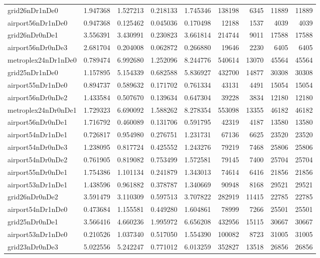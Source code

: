 \begin{longtable}{|l|r|r|r|r|r|r|r|r|}
grid26nDr1nDe0 & 1.947368 & 1.527213 & 0.218133 & 1.745346 & 138198 & 6345 & 11889 & 11889 \\
airport56nDr1nDe0 & 0.947368 & 0.125462 & 0.045036 & 0.170498 & 12188 & 1537 & 4039 & 4039 \\
grid26nDr0nDe1 & 3.556391 & 3.430991 & 0.230823 & 3.661814 & 214744 & 9011 & 17588 & 17588 \\
airport56nDr0nDe3 & 2.681704 & 0.204008 & 0.062872 & 0.266880 & 19646 & 2230 & 6405 & 6405 \\
metroplex24nDr1nDe0 & 0.789474 & 6.992680 & 1.252096 & 8.244776 & 540614 & 13070 & 45564 & 45564 \\
grid25nDr1nDe0 & 1.157895 & 5.154339 & 0.682588 & 5.836927 & 432700 & 14877 & 30308 & 30308 \\
airport55nDr1nDe0 & 0.894737 & 0.589632 & 0.171702 & 0.761334 & 43131 & 4491 & 15054 & 15054 \\
airport56nDr0nDe2 & 1.433584 & 0.507670 & 0.139634 & 0.647304 & 39228 & 3834 & 12180 & 12180 \\
metroplex24nDr0nDe1 & 1.729323 & 6.690092 & 1.588262 & 8.278354 & 553098 & 13355 & 46182 & 46182 \\
airport56nDr0nDe1 & 1.716792 & 0.460089 & 0.131706 & 0.591795 & 42319 & 4187 & 13580 & 13580 \\
airport54nDr1nDe1 & 0.726817 & 0.954980 & 0.276751 & 1.231731 & 67136 & 6625 & 23520 & 23520 \\
airport54nDr0nDe3 & 1.238095 & 0.817724 & 0.425552 & 1.243276 & 79219 & 7468 & 25806 & 25806 \\
airport54nDr0nDe2 & 0.761905 & 0.819082 & 0.753499 & 1.572581 & 79145 & 7400 & 25704 & 25704 \\
airport55nDr0nDe1 & 1.754386 & 1.101134 & 0.241879 & 1.343013 & 74614 & 6416 & 21856 & 21856 \\
airport53nDr1nDe1 & 1.438596 & 0.961882 & 0.378787 & 1.340669 & 90948 & 8168 & 29521 & 29521 \\
grid26nDr0nDe2 & 3.591479 & 3.110309 & 0.597513 & 3.707822 & 282919 & 11415 & 22785 & 22785 \\
airport54nDr1nDe0 & 0.473684 & 1.155581 & 0.449280 & 1.604861 & 78999 & 7266 & 25501 & 25501 \\
grid25nDr0nDe1 & 3.566416 & 4.660236 & 1.995972 & 6.656208 & 432956 & 15115 & 30667 & 30667 \\
airport53nDr1nDe0 & 0.210526 & 1.037340 & 0.517050 & 1.554390 & 100082 & 8723 & 31005 & 31005 \\
grid23nDr0nDe3 & 5.022556 & 5.242247 & 0.771012 & 6.013259 & 352827 & 13518 & 26856 & 26856 \\

\end{longtable}
